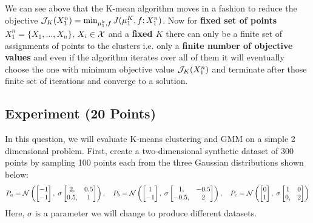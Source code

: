 \begin{enumerate}
\begin{soln}
    We can see above that the K-mean algorithm moves in a fashion to reduce the objective $\mathcal{J}_K(X_1^n) = \min_{\mu_1^k, f} J(\mu_1^K, f; X_1^n)$. Now for \textbf{fixed set of points} $X_1^n = \{X_1, \dots, X_n\}$, $X_i \in \mathcal{X}$ and a \textbf{fixed $K$} there can only be a finite set of assignments of points to the clusters i.e. only a \textbf{finite number of objective values} and even if the algorithm iterates over all of them it will eventually choose the one with minimum objective value $\mathcal{J}_K(X_1^n)$ and terminate after those finite set of iterations and converge to a solution. 
\end{soln}

\end{enumerate}



\subsection{Experiment (20 Points)}

In this question, we will evaluate
K-means clustering and GMM on a simple 2 dimensional problem.
First, create a two-dimensional synthetic dataset of 300 points by sampling 100 points each from the
three Gaussian distributions shown below:
\[
P_a = \mathcal{N}\left(
\begin{bmatrix}
-1 \\ -1
\end{bmatrix},
\;
\sigma\begin{bmatrix}
2, &0.5 \\ 0.5, &1
\end{bmatrix}
\right),
\quad
P_b = \mathcal{N}\left(
\begin{bmatrix}
1 \\ -1
\end{bmatrix},
\;
 \sigma\begin{bmatrix}
1, &-0.5 \\ -0.5, &2
\end{bmatrix}
\right),
\quad
P_c = \mathcal{N}\left(
\begin{bmatrix}
0 \\ 1
\end{bmatrix},
\;
 \sigma\begin{bmatrix}
1 &0 \\ 0, &2
\end{bmatrix}
\right)
\]
Here, $\sigma$ is a parameter we will change to produce different datasets.

